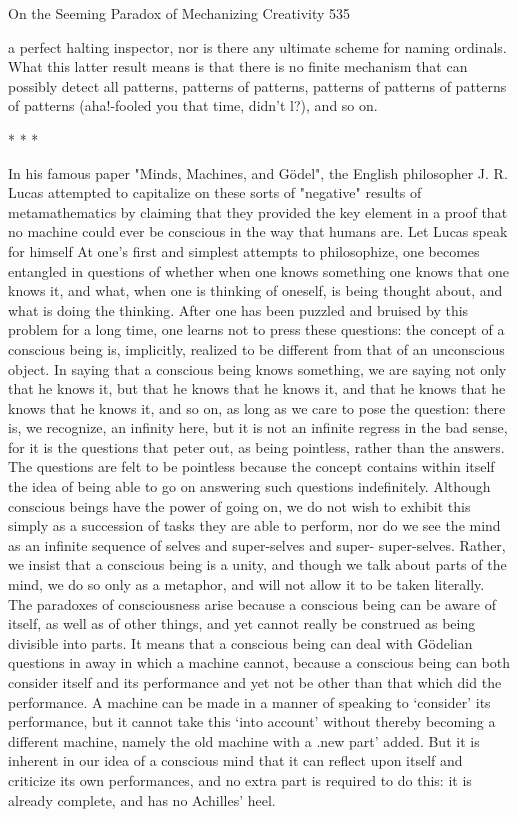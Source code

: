 On the Seeming Paradox of Mechanizing Creativity                                       535

a perfect halting inspector, nor is there any ultimate scheme for naming ordinals.
What this latter result means is that there is no finite mechanism that can possibly
detect all patterns, patterns of patterns, patterns of patterns of patterns of patterns
(aha!-fooled you that time, didn't l?), and so on.

                                       *   *   *

        In his famous paper "Minds, Machines, and Gödel", the English philosopher J.
R. Lucas attempted to capitalize on these sorts of "negative" results of
metamathematics by claiming that they provided the key element in a proof that no
machine could ever be conscious in the way that humans are. Let Lucas speak for
himself
           At one's first and simplest attempts to philosophize, one becomes
   entangled in questions of whether when one knows something one knows that
   one knows it, and what, when one is thinking of oneself, is being thought about,
   and what is doing the thinking. After one has been puzzled and bruised by this
   problem for a long time, one learns not to press these questions: the concept of a
   conscious being is, implicitly, realized to be different from that of an
   unconscious object. In saying that a conscious being knows something, we are
   saying not only that he knows it, but that he knows that he knows it, and that he
   knows that he knows that he knows it, and so on, as long as we care to pose the
   question: there is, we recognize, an infinity here, but it is not an infinite regress
   in the bad sense, for it is the questions that peter out, as being pointless, rather
   than the answers. The questions are felt to be pointless because the concept
   contains within itself the idea of being able to go on answering such questions
   indefinitely. Although conscious beings have the power of going on, we do not
   wish to exhibit this simply as a succession of tasks they are able to perform, nor
   do we see the mind as an infinite sequence of selves and super-selves and super-
   super-selves. Rather, we insist that a conscious being is a unity, and though we
   talk about parts of the mind, we do so only as a metaphor, and will not allow it
   to be taken literally.
           The paradoxes of consciousness arise because a conscious being can be
   aware of itself, as well as of other things, and yet cannot really be construed as
   being divisible into parts. It means that a conscious being can deal with
   Gödelian questions in away in which a machine cannot, because a conscious
   being can both consider itself and its performance and yet not be other than that
   which did the performance. A machine can be made in a manner of speaking to
   `consider' its performance, but it cannot take this `into account' without thereby
   becoming a different machine, namely the old machine with a .new part' added.
   But it is inherent in our idea of a conscious mind that it can reflect upon itself
   and criticize its own performances, and no extra part is required to do this: it is
   already complete, and has no Achilles' heel.

